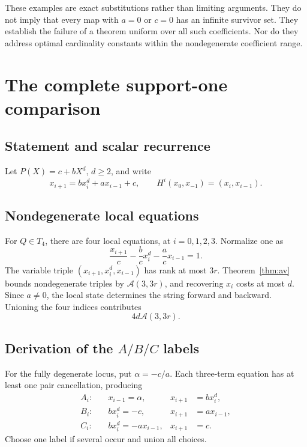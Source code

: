\documentclass[11pt]{article}
\theoremstyle{definition}
\newcommand{\Acal}{\mathcal A}
\begin{document}
These examples are exact substitutions rather than limiting arguments. They do not imply that every map with \(a=0\) or \(c=0\) has an infinite survivor set. They establish the failure of a theorem uniform over all such coefficients. Nor do they address optimal cardinality constants within the nondegenerate coefficient range.

\section{The complete support-one comparison}
\label{sec:supportone}

\subsection{Statement and scalar recurrence}

Let \(P(X)=c+bX^d\), \(d\geq2\), and write
\begin{equation}
 x_{i+1}=bx_i^d+ax_{i-1}+c,\qquad
 H^i(x_0,x_{-1})=(x_i,x_{i-1}).
 \label{eq:monomial-recurrence}
\end{equation}

\subsection{Nondegenerate local equations}

For \(Q\in T_4\), there are four local equations, at \(i=0,1,2,3\). Normalize one as
\begin{equation}
 \frac{x_{i+1}}c-\frac bcx_i^d-\frac acx_{i-1}=1.
 \label{eq:monomial-unit}
\end{equation}
The variable triple \((x_{i+1},x_i^d,x_{i-1})\) has rank at most \(3r\). Theorem~\ref{thm:av} bounds nondegenerate triples by \(\Acal(3,3r)\), and recovering \(x_i\) costs at most \(d\). Since \(a\neq0\), the local state determines the string forward and backward. Unioning the four indices contributes
\begin{equation}
 4d\Acal(3,3r).
 \label{eq:pc3-nondeg}
\end{equation}

\subsection{Derivation of the \texorpdfstring{\(A/B/C\)}{A/B/C} labels}

For the fully degenerate locus, put \(\alpha=-c/a\). Each three-term equation has at least one pair cancellation, producing
\begin{align}
 A_i:\quad&x_{i-1}=\alpha,&x_{i+1}&=bx_i^d,
 \label{eq:A-label}\\
 B_i:\quad&bx_i^d=-c,&x_{i+1}&=ax_{i-1},
 \label{eq:B-label}\\
 C_i:\quad&bx_i^d=-ax_{i-1},&x_{i+1}&=c.
 \label{eq:C-label}
\end{align}
Choose one label if several occur and union all choices.
\end{document}
